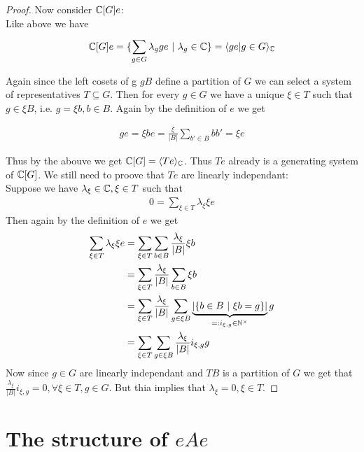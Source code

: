 \documentclass[]{article}
\begin{document}
\begin{proof}
Now consider \({\mathbb{C}}[G]e\): \\
Like above we have
\begin{align*}
    {\mathbb{C}}[G]e = \{ \sum_{g \in G}^{} \lambda_g g e \ | \ \lambda_g \in {\mathbb{C}}\} = \langle ge | g \in G \rangle_{\mathbb{C}}
\end{align*}

Again since the left cosets of g \(gB\) define a partition of \(G\) we can select a system of representatives \(T \subseteq G\).
Then for every \(g \in G\) we have a unique \(\xi \in T\) such that \(g \in \xi B\), i.e. \(g = \xi b, b \in B\). Again by the definition 
of \(e\) we get

\begin{align*}
    ge = \xi be = \frac{\xi}{|B|} \sum_{b' \in B}^{} b b' =\xi e
\end{align*}

Thus by the abouve we get \({\mathbb{C}}[G]=\langle T e \rangle_{\mathbb{C}}\). Thus \(Te\) already is a generating system of \({\mathbb{C}}[G]\). We still need to proove
that \(Te\) are linearly independant: \\
Suppose we have \(\lambda_\xi \in {\mathbb{C}}, \xi \in T\) such that 
\begin{align*}
    0 = \sum_{\xi \in T}^{} \lambda_\xi \xi e 
\end{align*}
Then again by the definition of \(e\) we get
\begin{align*}
    \sum_{\xi \in T}^{} \lambda_\xi \xi e &= \sum_{\xi \in T}^{} \sum_{b\in B}^{} \frac{\lambda_\xi}{|B|} \xi b \\
    &= \sum_{\xi \in T}^{} \frac{\lambda_\xi}{|B|} \sum_{b\in B}^{}  \xi b \\
    &= \sum_{\xi \in T}^{} \frac{\lambda_\xi}{|B|} \sum_{g \in \xi B}^{}  \underbrace{|\{b \in B \ | \ \xi b = g \}|}_{=:i_{\xi,g} \in {\mathbb{N}}^\times} g\\
    &= \sum_{\xi \in T}^{} \sum_{g \in \xi B}^{} \frac{\lambda_\xi}{|B|} i_{\xi,g} g\\
\end{align*}
Now since \(g \in G\) are linearly independant and \(TB\) is a partition of \(G\) we get that \(\frac{\lambda_\xi}{|B|} i_{\xi,g}=0, \forall \xi \in T, g \in G\).
But thia implies that \(\lambda_\xi = 0, \xi \in T\).

\end{proof}

\setcounter{section}{14}
\section{The structure of \(eAe\)}
\end{document}
